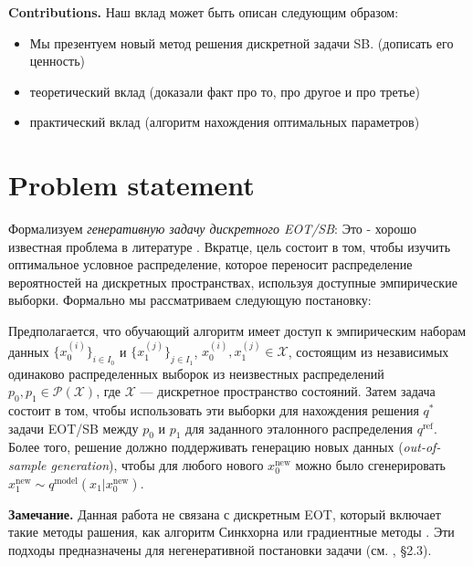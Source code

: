 \documentclass{article}
\begin{document}
\textbf{Contributions.} Наш вклад может быть описан следующим образом:
\begin{itemize}
    \item Мы презентуем новый метод решения дискретной задачи SB. (дописать его ценность)
    \item теоретический вклад (доказали факт про то, про другое и про третье)
    \item практический вклад (алгоритм нахождения оптимальных параметров)
\end{itemize}




\section{Problem statement}\label{sec:prostate}

Формализуем \textit{генеративную задачу дискретного EOT/SB}:
Это - хорошо известная проблема в литературе \citep{kim2024discrete, ksenofontov2025categorical}. Вкратце, цель состоит в том, чтобы изучить оптимальное условное распределение, которое переносит распределение вероятностей на дискретных пространствах, используя доступные эмпирические выборки. Формально мы рассматриваем следующую постановку:

Предполагается, что обучающий алгоритм имеет доступ к эмпирическим наборам данных \(\{x_0^{(i)}\}_{i \in I_0}\) и \(\{x_1^{(j)}\}_{j \in I_1}\), \(x_0^{(i)}, x_1^{(j)} \in \mathcal{X}\), состоящим из независимых одинаково распределенных выборок из неизвестных распределений \(p_0, p_1 \in \mathcal{P}(\mathcal{X})\), где \(\mathcal{X}\) — дискретное пространство состояний. Затем задача состоит в том, чтобы использовать эти выборки для нахождения решения \(q^*\) задачи EOT/SB между \(p_0\) и \(p_1\) для заданного эталонного распределения \(q^{\text{ref}}\). Более того, решение должно поддерживать генерацию новых данных (\textit{out-of-sample generation}), чтобы для любого нового \(x_0^{\text{new}}\) можно было сгенерировать \(x_1^{\text{new}} \sim q^{\text{model}}(x_1|x_0^{\text{new}})\).

\textbf{Замечание.} Данная работа не связана с дискретным EOT, который включает такие методы рашения, как алгоритм Синкхорна \citep{cuturi2013sinkhorn} или градиентные методы \citep{dvurechensky2018computational}. Эти подходы предназначены для негенеративной постановки задачи (см. \citet{ksenofontov2025categorical}, §2.3).
\end{document}
